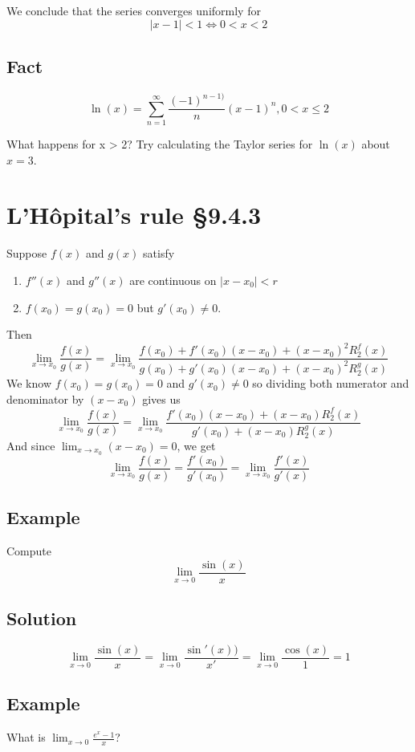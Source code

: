 \documentclass[11pt]{article}
\begin{document}
We conclude that the series converges uniformly for
\[ |x-1| < 1 \Leftrightarrow 0 < x < 2 \]

\subsection{Fact}
\[ \ln(x) = \sum_{n=1}^\infty \frac{(-1)^{n-1)}}{n} (x-1)^n, 0 < x \leq 2 \]

What happens for x > 2? Try calculating the Taylor series for $\ln(x)$ about $x=3$.

\section{L'Hôpital's rule §9.4.3}
Suppose $f(x)$ and $g(x)$ satisfy
\begin{enumerate}[ (i) ]
\item $f''(x)$ and $g''(x)$ are continuous on $|x-x_0| < r$
\item $f(x_0)=g(x_0)=0$ but $g'(x_0) \not= 0$.
\end{enumerate}

Then
\[ \lim_{x\rightarrow x_0} \frac{f(x)}{g(x)} =  \lim_{x\rightarrow x_0} \frac{ f(x_0) + f'(x_0)(x-x_0) + (x-x_0)^2 R_2^f(x) }{ g(x_0) + g'(x_0)(x-x_0) + (x-x_0)^2 R_2^g(x) }   \]
We know $f(x_0)=g(x_0)=0$ and $g'(x_0) \not= 0$ so dividing both numerator and denominator by $(x-x_0)$ gives us
\[ \lim_{x\rightarrow x_0} \frac{f(x)}{g(x)} = \lim_{x\rightarrow x_0} \frac{f'(x_0)(x-x_0) + (x-x_0) R_2^f(x) }{ g'(x_0) + (x-x_0) R_2^g(x) } \]
And since $\lim_{x\rightarrow x_0} (x-x_0) = 0$, we get
\[ \lim_{x\rightarrow x_0} \frac{f(x)}{g(x)} = \frac{f'(x_0)}{g'(x_0)} = \lim_{x\rightarrow x_0} \frac{f'(x)}{g'(x)} \]

\subsection{Example}
Compute 
\[ \lim_{x\rightarrow 0} \frac{\sin(x)}{x} \]

\subsection{Solution}
\[ \lim_{x\rightarrow 0 } \frac{\sin(x)}{x} = \lim_{x	\rightarrow 0 } \frac{\sin '(x))}{x'} = \lim_{x\rightarrow0} \frac{\cos(x)}{1} = 1 \]

\subsection{Example}
What is $\displaystyle{\lim_{x\rightarrow 0 } \frac{e^x-1}{x}}$?
\end{document}
